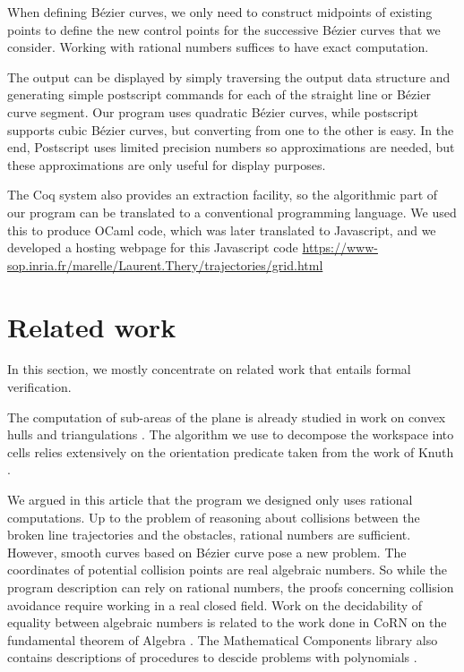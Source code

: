 \documentclass{easychair}
\begin{document}
When defining Bézier curves, we only need to construct midpoints of
existing points to define the new control points for the successive
Bézier curves that we consider.  Working with rational numbers
suffices to have exact computation.

The output can be displayed by simply traversing the
output data structure and generating simple postscript commands for
each of the straight line or Bézier curve segment.  Our program uses
quadratic Bézier curves, while postscript supports cubic Bézier
curves, but converting from one to the other is easy.  In the end,
Postscript uses limited precision numbers so approximations are
needed, but these approximations are only useful for display purposes.

The Coq system also provides an extraction facility, so the
algorithmic part of our program can be translated to a conventional
programming language.  We used this to produce OCaml code, which was
later translated to Javascript, and we developed a hosting webpage for
this Javascript code
\url{https://www-sop.inria.fr/marelle/Laurent.Thery/trajectories/grid.html}

\section{Related work}
In this section, we mostly concentrate on related work that entails formal
verification.

The computation of sub-areas of the plane is already studied in work
on convex hulls \cite{PichardieBertot01} and triangulations
\cite{DufourdBertot10,Bertot18}.  The algorithm we use to decompose
the workspace into cells relies extensively on the orientation
predicate taken from the work of Knuth \cite{KnuthAxiomsAndHulls}.

We argued in this article that the program we designed only uses
rational computations.  Up to the problem of reasoning about
collisions between the broken line trajectories and the obstacles,
rational numbers are sufficient.  However, smooth curves based on
Bézier curve pose a new problem.  The coordinates of potential
collision points are real algebraic numbers.  So while the program
description can rely on rational numbers, the proofs concerning
collision avoidance require working in a real closed field.  Work on
the decidability of equality between algebraic numbers is related to
the work done in CoRN on the fundamental theorem of Algebra
\cite{GeuversWZ00}.  The Mathematical Components library also contains
descriptions of procedures to descide problems with polynomials
\cite{CohenMQERCF}.
\end{document}
